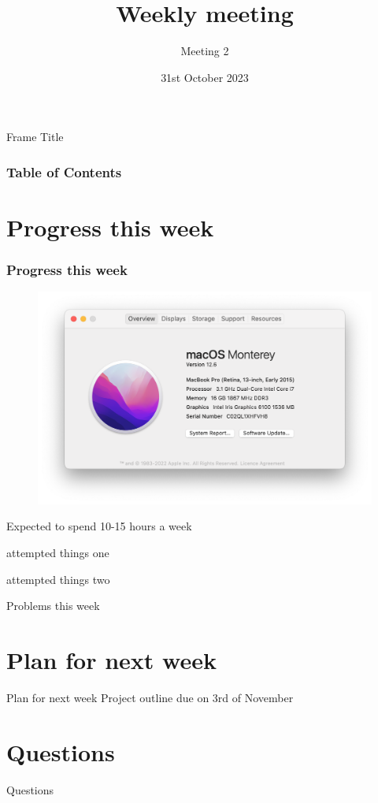 \documentclass{beamer}
\title{Weekly meeting}
\subtitle{Meeting 2}
\date{31st October 2023}
\begin{document}
\frame{\titlepage}

\begin{frame}{Frame Title}
\frametitle{Table of Contents}
\tableofcontents
\end{frame}


\section{Progress this week}
\begin{frame}
\frametitle{Progress this week}
\begin{figure}
    \centering
    \includegraphics[scale=0.15]{Weekly meeting slides/Screenshot 2023-10-27 at 10.20.22 am.png}
    \label{fig:enter-label}
\end{figure}
Expected to spend 10-15 hours a week

attempted things one

attempted things two
\end{frame}

\begin{frame}{Problems this week}
    
\end{frame}

\section{Plan for next week}
\begin{frame}{Plan for next week}
    Project outline due on 3rd of November
\end{frame}

\section{Questions}

\begin{frame}{Questions}
    
\end{frame}
\end{document}
